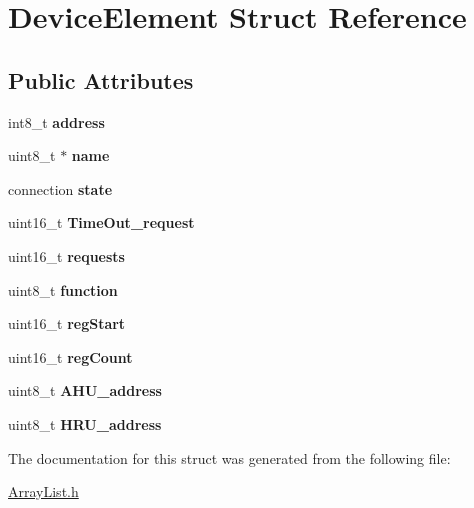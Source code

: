 \hypertarget{structDeviceElement}{\section{Device\+Element Struct Reference}
\label{structDeviceElement}
}
\subsection*{Public Attributes}
\begin{DoxyCompactItemize}
\item 
\hypertarget{structDeviceElement_af7fc860b6e2664783a395c32f8468619}{int8\+\_\+t {\bfseries address}}\label{structDeviceElement_af7fc860b6e2664783a395c32f8468619}

\item 
\hypertarget{structDeviceElement_abfc5b52818fff63d69f04c2bf81584b1}{uint8\+\_\+t $\ast$ {\bfseries name}}\label{structDeviceElement_abfc5b52818fff63d69f04c2bf81584b1}

\item 
\hypertarget{structDeviceElement_ac1c2d2fb2b6aae79947d76966b7e22d8}{connection {\bfseries state}}\label{structDeviceElement_ac1c2d2fb2b6aae79947d76966b7e22d8}

\item 
\hypertarget{structDeviceElement_a412298dcc990a660e755572da6527e13}{uint16\+\_\+t {\bfseries Time\+Out\+\_\+request}}\label{structDeviceElement_a412298dcc990a660e755572da6527e13}

\item 
\hypertarget{structDeviceElement_a600f66639109aa27a82d56f68961a3d3}{uint16\+\_\+t {\bfseries requests}}\label{structDeviceElement_a600f66639109aa27a82d56f68961a3d3}

\item 
\hypertarget{structDeviceElement_a6212c16fe619602672cda38df526a4f3}{uint8\+\_\+t {\bfseries function}}\label{structDeviceElement_a6212c16fe619602672cda38df526a4f3}

\item 
\hypertarget{structDeviceElement_ad63e461232f29910f4cda4c573fcdd45}{uint16\+\_\+t {\bfseries reg\+Start}}\label{structDeviceElement_ad63e461232f29910f4cda4c573fcdd45}

\item 
\hypertarget{structDeviceElement_a8ae32e5db29e4852fa581b63453f08d5}{uint16\+\_\+t {\bfseries reg\+Count}}\label{structDeviceElement_a8ae32e5db29e4852fa581b63453f08d5}

\item 
\hypertarget{structDeviceElement_afee7e2e64a047cbe2714849bd44ceb93}{uint8\+\_\+t {\bfseries A\+H\+U\+\_\+address}}\label{structDeviceElement_afee7e2e64a047cbe2714849bd44ceb93}

\item 
\hypertarget{structDeviceElement_a54f09006d3d645f7e588b26aa69512e8}{uint8\+\_\+t {\bfseries H\+R\+U\+\_\+address}}\label{structDeviceElement_a54f09006d3d645f7e588b26aa69512e8}

\end{DoxyCompactItemize}


The documentation for this struct was generated from the following file\+:\begin{DoxyCompactItemize}
\item 
\hyperlink{ArrayList_8h}{Array\+List.\+h}\end{DoxyCompactItemize}
